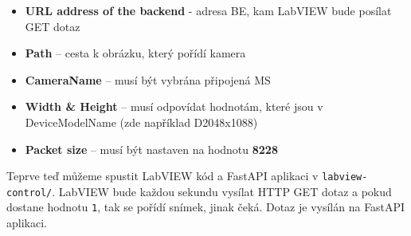 \documentclass[12pt]{article}
\begin{document}
\begin{teamwork}
        \begin{itemize}
            \item \textbf{URL address of the backend} - adresa BE, kam LabVIEW bude posílat GET dotaz
            \item \textbf{Path} – cesta k obrázku, který pořídí kamera
            \item \textbf{CameraName} – musí být vybrána připojená MS
            \item \textbf{Width \& Height} – musí odpovídat hodnotám, které jsou v DeviceModelName (zde například D2048x1088)
            \item \textbf{Packet size} – musí být nastaven na hodnotu \textbf{8228}
        \end{itemize}

        Teprve teď můžeme spustit LabVIEW kód a FastAPI aplikaci v \texttt{labview-control/}.
        LabVIEW bude každou sekundu vysílat HTTP GET dotaz a pokud dostane hodnotu \texttt{1}, tak se pořídí snímek, jinak čeká.
        Dotaz je vysílán na FastAPI aplikaci.
    \end{teamwork}
\end{document}
